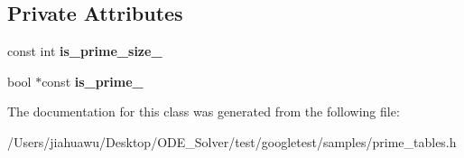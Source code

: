 \subsection*{Private Attributes}
\begin{DoxyCompactItemize}
\item 
\mbox{\label{class_pre_calculated_prime_table_ad4275df41c5e5be3cad8c5abeaad1ac6}} 
const int {\bfseries is\+\_\+prime\+\_\+size\+\_\+}
\item 
\mbox{\label{class_pre_calculated_prime_table_ac393ebf41a32b3cba39fe67f7aa5fa38}} 
bool $\ast$const {\bfseries is\+\_\+prime\+\_\+}
\end{DoxyCompactItemize}


The documentation for this class was generated from the following file\+:\begin{DoxyCompactItemize}
\item 
/\+Users/jiahuawu/\+Desktop/\+O\+D\+E\+\_\+\+Solver/test/googletest/samples/prime\+\_\+tables.\+h\end{DoxyCompactItemize}
